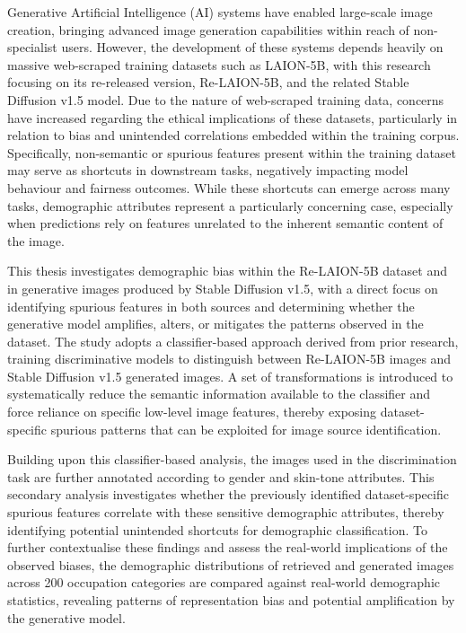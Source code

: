 Generative Artificial Intelligence (AI) systems have enabled large-scale image creation, bringing advanced image generation capabilities within reach of non-specialist users. However, the development of these systems depends heavily on massive web-scraped training datasets such as LAION-5B, with this research focusing on its re-released version, Re-LAION-5B, and the related Stable Diffusion v1.5 model. Due to the nature of web-scraped training data, concerns have increased regarding the ethical implications of these datasets, particularly in relation to bias and unintended correlations embedded within the training corpus. Specifically, non-semantic or spurious features present within the training dataset may serve as shortcuts in downstream tasks, negatively impacting model behaviour and fairness outcomes. While these shortcuts can emerge across many tasks, demographic attributes represent a particularly concerning case, especially when predictions rely on features unrelated to the inherent semantic content of the image.

This thesis investigates demographic bias within the Re-LAION-5B dataset and in generative images produced by Stable Diffusion v1.5, with a direct focus on identifying spurious features in both sources and determining whether the generative model amplifies, alters, or mitigates the patterns observed in the dataset. The study adopts a classifier-based approach derived from prior research, training discriminative models to distinguish between Re-LAION-5B images and Stable Diffusion v1.5 generated images. A set of transformations is introduced to systematically reduce the semantic information available to the classifier and force reliance on specific low-level image features, thereby exposing dataset-specific spurious patterns that can be exploited for image source identification.

Building upon this classifier-based analysis, the images used in the discrimination task are further annotated according to gender and skin-tone attributes. This secondary analysis investigates whether the previously identified dataset-specific spurious features correlate with these sensitive demographic attributes, thereby identifying potential unintended shortcuts for demographic classification. To further contextualise these findings and assess the real-world implications of the observed biases, the demographic distributions of retrieved and generated images across 200 occupation categories are compared against real-world demographic statistics, revealing patterns of representation bias and potential amplification by the generative model.

